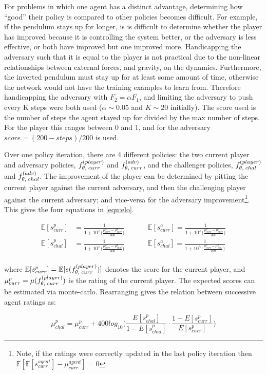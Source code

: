 \documentclass[../main.tex]{subfiles}
\begin{document}
For problems in which one agent has a distinct advantage, determining how ``good'' their policy is compared to other policies becomes difficult. For example, if the pendulum stays up for longer, is is difficult to determine whether the player has improved because it is controlling the system better, or the adversary is less effective, or both have improved but one improved more. Handicapping the adversary such that it is equal to the player is not practical due to the non-linear relationships between external forces, and gravity, on the dynamics. Furthermore, the inverted pendulum must stay up for at least some amount of time, otherwise the network would not have the training examples to learn from. Therefore handicapping the adversary with $F_2 = \alpha F_1$, and limiting the adversary to push every K steps were both used ($\alpha \sim 0.05$ and $K \sim 20$ initially). The score used is the number of steps the agent stayed up for divided by the max number of steps. For the player this ranges between 0 and 1, and for the adversary $score = (200-steps)/200$ is used. 

Over one policy iteration, there are 4 different policies: the two current player and adversary policies, $f_{\theta, \; curr}^{(player)}$ and $f_{\theta, \; curr}^{(adv)}$, and the challenger policies,  $f_{\theta, \; chal}^{(player)}$ and $f_{\theta, \; chal}^{(adv)}$. The improvement of the player can be determined by pitting the current player against the current adversary, and then the challenging player against the current adversary; and vice-versa for the adversary improvement\footnote{Note, if the ratings were correctly updated in the last policy iteration then $\mathbb{E}[\mathbb{E}[s_{curr}^{agent}] - \mu_{curr}^{agent}] = 0$}. This gives the four equations in \cref{equ:elo}.

\begin{align}
   \mathbb{E}[s^p_{curr}] &= \frac{1}{1+10^\wedge \big( \frac{\mu^a_{curr} - \mu^p_{curr}}{400} \big)} \hspace{1cm} &\mathbb{E}[s^a_{curr}] = \frac{1}{1+10^\wedge \big( \frac{\mu^p_{curr} - \mu^a_{curr}}{400} \big)}\\
   \mathbb{E}[s^p_{chal}] &= \frac{1}{1+10^\wedge \big( \frac{\mu^a_{curr} - \mu^p_{chal}}{400} \big)} \hspace{1cm} &\mathbb{E}[s^a_{chal}] = \frac{1}{1+10^\wedge \big( \frac{\mu^p_{curr} - \mu^a_{chal}}{400} \big)}\\
\end{align}

where $\mathbb{E}[s^p_{curr}] = \mathbb{E}[s(f_{\theta, \; curr}^{(player)})]$ denotes the score for the current player, and $\mu^p_{curr} = \mu(f_{\theta, \; curr}^{(player)})$ is the rating of the current player. The expected scores can be estimated via monte-carlo. Rearranging gives the relation between successive agent ratings as:

\begin{equation}
   \mu^p_{chal} = \mu^p_{curr} + 400log_{10} \bigg( \frac{{E}[s^p_{chal}]}{1 - {E}[s^p_{chal}]} \cdot \frac{1 - {E}[s^p_{curr}]}{{E}[s^p_{curr}]}    \bigg)
\end{equation}


\appendix
\onlyinsubfile{}
\end{document}
